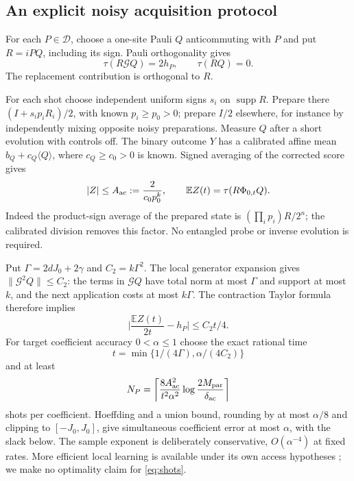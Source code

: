 \documentclass[11pt,reqno]{amsart}
\numberwithin{equation}{section}
\theoremstyle{definition}
\theoremstyle{remark}
\newcommand{\supp}{\operatorname{supp}}
\newcommand{\E}{\mathbb E}
\newcommand{\nn}[1]{\lVert#1\rVert}
\newcommand{\abs}[1]{\lvert#1\rvert}
\newcommand{\cG}{\mathcal G}
\begin{document}
\subsection{An explicit noisy acquisition protocol}
For each $P\in\mathcal D$, choose a one-site Pauli $Q$ anticommuting with $P$ and put $R=iPQ$, including its sign. Pauli orthogonality gives
\begin{equation}\label{eq:learnidentity}
 \tau(R\cG Q)=2h_P,\qquad\tau(RQ)=0.
\end{equation}
The replacement contribution is orthogonal to $R$.

For each shot choose independent uniform signs $s_i$ on $\supp R$. Prepare there $(I+s_ip_iR_i)/2$, with known $p_i\geq p_0>0$; prepare $I/2$ elsewhere, for instance by independently mixing opposite noisy preparations. Measure $Q$ after a short evolution with controls off. The binary outcome $Y$ has a calibrated affine mean $b_Q+c_Q\langle Q\rangle$, where $c_Q\geq c_0>0$ is known. Signed averaging of the corrected score gives
\begin{equation}\label{eq:score}
 |Z|\leq A_{\rm ac}:=\frac2{c_0p_0^k},\qquad
 \E Z(t)=\tau(R\Phi_{0,t}Q).
\end{equation}
Indeed the product-sign average of the prepared state is $(\prod_i p_i)R/2^n$; the calibrated division removes this factor. No entangled probe or inverse evolution is required.

Put $\Gamma=2dJ_0+2\gamma$ and $C_2=k\Gamma^2$. The local generator expansion gives $\nn{\cG^2Q}\leq C_2$: the terms in $\cG Q$ have total norm at most $\Gamma$ and support at most $k$, and the next application costs at most $k\Gamma$. The contraction Taylor formula therefore implies
\begin{equation}\label{eq:learnbias}
 \abs{\frac{\E Z(t)}{2t}-h_P}\leq C_2t/4.
\end{equation}
For target coefficient accuracy $0<\alpha\leq1$ choose the exact rational time
\begin{equation}\label{eq:learntime}
 t=\min\{1/(4\Gamma),\alpha/(4C_2)\}
\end{equation}
and at least
\begin{equation}\label{eq:shots}
 N_P=\left\lceil\frac{8A_{\rm ac}^2}{t^2\alpha^2}
 \log\frac{2M_{\rm par}}{\delta_{\rm ac}}\right\rceil
\end{equation}
shots per coefficient. Hoeffding and a union bound, rounding by at most $\alpha/8$ and clipping to $[-J_0,J_0]$, give simultaneous coefficient error at most $\alpha$, with the slack below. The sample exponent is deliberately conservative, $O(\alpha^{-4})$ at fixed rates. More efficient local learning is available under its own access hypotheses \cite[Theorem~4.9]{MBFR}; we make no optimality claim for \eqref{eq:shots}.
\end{document}
